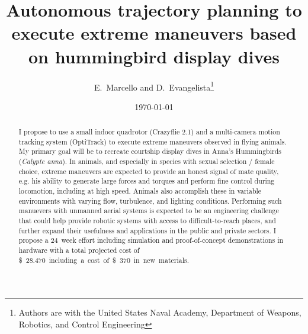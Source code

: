 \documentclass[onecolumn,10pt]{IEEEtran}
\title{Autonomous trajectory planning to execute extreme maneuvers based on hummingbird display dives}
\author{E.~Marcello and D.~Evangelista\thanks{Authors are with the United States Naval Academy, Department of Weapons, Robotics, and Control Engineering}}
\date{\today}
\begin{document}
\maketitlepage
\maketitle

\begin{abstract}
I propose to use a small indoor quadrotor (Crazyflie 2.1) and a multi-camera motion tracking system (OptiTrack) to execute extreme maneuvers observed in flying animals.  My primary goal will be to recreate courtship display dives in Anna's Hummingbirds (\emph{Calypte anna}). In animals, and especially in species with sexual selection / female choice, extreme maneuvers are expected to provide an honest signal of mate quality, e.g. his ability to generate large forces and torques and perform fine control during locomotion, including at high speed. Animals also accomplish these in variable environments with varying flow, turbulence, and lighting conditions. Performing such manuevers with unmanned aerial systems is expected to be an engineering challenge that could help provide robotic systems with access to difficult-to-reach places, and further expand their usefulness and applications in the public and private sectors. I propose a  \SI{24}{week} effort including simulation and proof-of-concept demonstrations in hardware with a total projected cost of \SI{28,470}[\$] including a cost of \SI{370}[\$] in new materials. 



\end{abstract}
\end{document}
